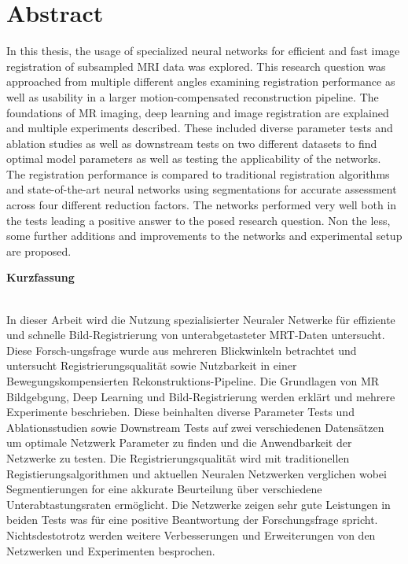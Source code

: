 \chapter*{Abstract}
In this thesis, the usage of specialized neural networks for efficient and fast image registration of subsampled MRI data was explored. This research question was approached from multiple different angles examining registration performance as well as usability in a larger motion-compensated reconstruction pipeline. The foundations of MR imaging, deep learning and image registration are explained and multiple experiments described. These included diverse parameter tests and ablation studies as well as downstream tests on two different datasets to find optimal model parameters as well as testing the applicability of the networks. The registration performance is compared to traditional registration algorithms and state-of-the-art neural networks using segmentations for accurate assessment across four different reduction factors. The networks performed very well both in the tests leading a positive answer to the posed research question. Non the less, some further additions and improvements to the networks and experimental setup are proposed.

\vspace*{1.5cm}
\begin{Huge}
\noindent \textbf{Kurzfassung}
\end{Huge}
\chapterheadstartvskip \\
In dieser Arbeit wird die Nutzung spezialisierter Neuraler Netwerke für effiziente und schnelle Bild-Registrierung von unterabgetasteter MRT-Daten untersucht. Diese Forsch-ungsfrage wurde aus mehreren Blickwinkeln betrachtet und untersucht Registrierungsqualität sowie Nutzbarkeit in einer Bewegungskompensierten Rekonstruktions-Pipeline. Die Grundlagen von MR Bildgebgung, Deep Learning und Bild-Registrierung werden erklärt und mehrere Experimente beschrieben. Diese beinhalten diverse Parameter Tests und Ablationsstudien sowie Downstream Tests auf zwei verschiedenen Datensätzen um optimale Netzwerk Parameter zu finden und die Anwendbarkeit der Netzwerke zu testen. Die Registrierungsqualität wird mit traditionellen Registierungsalgorithmen und aktuellen Neuralen Netzwerken verglichen  wobei Segmentierungen for eine akkurate Beurteilung über verschiedene Unterabtastungsraten ermöglicht. Die Netzwerke zeigen sehr gute Leistungen in beiden Tests was für eine positive Beantwortung der Forschungsfrage spricht. Nichtsdestotrotz werden weitere Verbesserungen und Erweiterungen von den Netzwerken und Experimenten besprochen.
